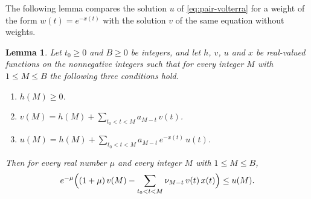 \documentclass{amsart}
\newtheorem{lemma}[theorem]{Lemma}
\theoremstyle{definition}
\theoremstyle{remark}
\numberwithin{equation}{section}
\begin{document}
The following lemma compares the solution $u$ of \eqref{eq:pair-volterra}
for a weight of the form $w(t)=e^{-x(t)}$ with the solution $v$ of the same
equation without weights.

\begin{lemma}\label{lem:volterra}
Let $t_0\ge0$ and $B\ge0$ be integers, and let $h$, $v$, $u$ and $x$ be
real-valued functions on the nonnegative integers such that for every integer
$M$ with $1\le M\le B$ the following three conditions hold.
\begin{enumerate}
\item $h(M)\ge0$.
\item $v(M)=h(M)+\sum_{t_0<t<M}a_{M-t}\,v(t)$.
\item $u(M)=h(M)+\sum_{t_0<t<M}a_{M-t}\,e^{-x(t)}\,u(t)$.
\end{enumerate}
Then for every real number $\mu$ and every integer $M$ with $1\le M\le B$,
\[
e^{-\mu}\Bigl((1+\mu)\,v(M)-\sum_{t_0<t<M}\nu_{M-t}\,v(t)\,x(t)\Bigr)\le u(M).
\]
\end{lemma}
\end{document}
